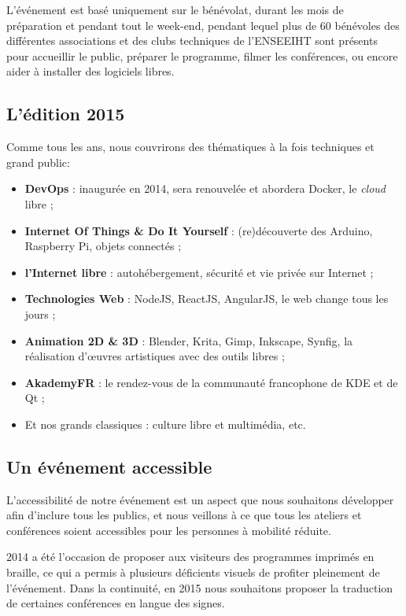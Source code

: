 \Separateur

L'événement est basé uniquement sur le bénévolat, durant les mois 
de préparation et pendant tout le week-end, pendant lequel plus de 60 
bénévoles des différentes associations et des clubs techniques de l'ENSEEIHT
sont présents pour accueillir le public, préparer le 
programme, filmer les conférences, ou encore aider à installer des 
logiciels libres.

\subsection{L'édition 2015}

Comme tous les ans, nous couvrirons des thématiques à la fois techniques et grand 
public:

\begin{itemize}[label=$\bullet$]
\item \textbf{DevOps} : inaugurée en 2014, sera renouvelée et abordera Docker, le \textit{cloud} libre ;
\item \textbf{Internet Of Things \& Do It Yourself} : (re)découverte des Arduino, Raspberry Pi, objets connectés ;
\item \textbf{l’Internet libre} : autohébergement, sécurité et vie privée sur Internet ;
\item \textbf{Technologies Web} : NodeJS, ReactJS, AngularJS, le web change tous les jours ;
\item \textbf{Animation 2D \& 3D} : Blender, Krita, Gimp, Inkscape, Synfig, la réalisation d'œuvres artistiques avec des outils libres ;
\item \textbf{AkademyFR} : le rendez-vous de la communauté francophone de KDE et de Qt ;
\item Et nos grands classiques : culture libre et multimédia, etc.
\end{itemize}

\subsection{Un événement accessible}

\begin{minipage}{0.3\textwidth}
\begin{center}
\end{center}
\end{minipage}
\begin{minipage}{0.7\textwidth}
L'accessibilité de notre événement est un aspect que nous souhaitons
 développer afin d'inclure tous les publics, et nous veillons à ce que
 tous les ateliers et conférences soient accessibles pour les personnes
 à mobilité réduite.

2014 a été l'occasion de proposer aux visiteurs des programmes
 imprimés en braille, ce qui a permis à plusieurs déficients visuels
 de profiter pleinement de l'événement. Dans la continuité, en 2015
 nous souhaitons proposer la traduction de certaines conférences en
 langue des signes.
\end{minipage}


